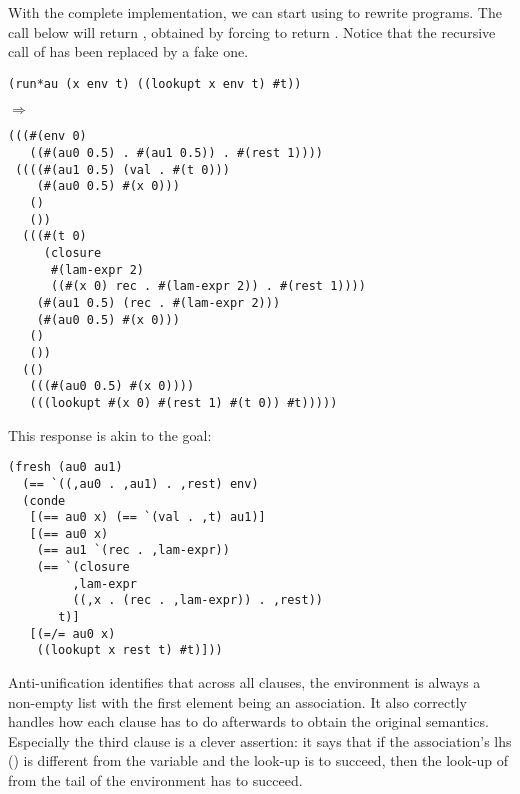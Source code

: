 With the complete implementation, we can start using  to rewrite programs. The call below will return , obtained by forcing  to return . Notice that the recursive call of  has been replaced by a fake one.
\begin{lstlisting}
(run*au (x env t) ((lookupt x env t) #t))
\end{lstlisting}
$\Rightarrow$
\begin{lstlisting}
(((#(env 0) 
   ((#(au0 0.5) . #(au1 0.5)) . #(rest 1))))
 ((((#(au1 0.5) (val . #(t 0)))
    (#(au0 0.5) #(x 0)))
   () 
   ())
  (((#(t 0)
     (closure
      #(lam-expr 2)
      ((#(x 0) rec . #(lam-expr 2)) . #(rest 1))))
    (#(au1 0.5) (rec . #(lam-expr 2)))
    (#(au0 0.5) #(x 0)))
   ()
   ())
  (() 
   (((#(au0 0.5) #(x 0))))
   (((lookupt #(x 0) #(rest 1) #(t 0)) #t)))))
\end{lstlisting}
This response is akin to the goal:
\begin{lstlisting}
(fresh (au0 au1)
  (== `((,au0 . ,au1) . ,rest) env)
  (conde
   [(== au0 x) (== `(val . ,t) au1)]
   [(== au0 x)
    (== au1 `(rec . ,lam-expr))
    (== `(closure
         ,lam-expr
         ((,x . (rec . ,lam-expr)) . ,rest))
       t)]
   [(=/= au0 x)
    ((lookupt x rest t) #t)]))
\end{lstlisting}
Anti-unification identifies that across all clauses, the environment is always a non-empty list with the first element being an association. It also correctly handles how each clause has to do afterwards to obtain the original semantics. Especially the third clause is a clever assertion: it says that if the association's lhs () is different from the variable  and the look-up is to succeed, then the look-up of  from the tail of the environment has to succeed.